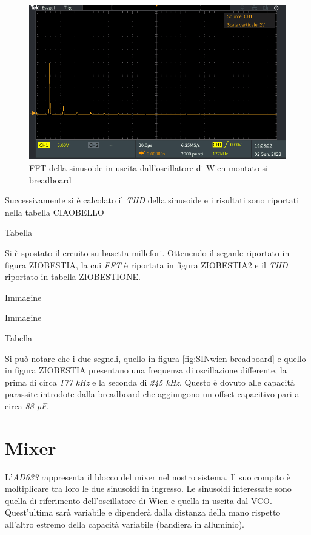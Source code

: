 \documentclass[titlepage]{report}
\begin{document}
	\begin{figure}[H]
		\centering
		\includegraphics[scale=0.5]{Immagini/FFT wien giusto bread.PNG}
		\caption{FFT della sinusoide in uscita dall'oscillatore di Wien montato si breadboard}
		\label{fig:FFT SINwien breadboard}
	\end{figure} 

	Successivamente si è calcolato il \textit{THD} della sinusoide e i risultati sono riportati nella tabella CIAOBELLO

	Tabella

	Si è spostato il crcuito su basetta millefori. Ottenendo il seganle riportato in figura ZIOBESTIA, la cui \textit{FFT} è riportata in figura ZIOBESTIA2 e il \textit{THD} riportato in tabella ZIOBESTIONE.

	Immagine

	Immagine

	Tabella

	Si può notare che i due segneli, quello in figura \ref{fig:SINwien breadboard} e quello in figura ZIOBESTIA presentano una frequenza di oscillazione differente, la prima di circa \textit{177 kHz} e la seconda di \textit{245 kHz}. Questo è dovuto alle capacità parassite introdote dalla breadboard che aggiungono un offset capacitivo pari a circa \textit{88 pF}.




\section{Mixer}
\label{sec:Mixer}

	L'\textit{AD633} rappresenta il blocco del mixer nel nostro sistema. Il suo compito è moltiplicare tra loro le due sinusoidi in ingresso. Le sinusoidi interessate sono quella di riferimento dell'oscillatore di Wien e quella in uscita dal VCO. Quest'ultima sarà variabile e dipenderà dalla distanza della mano rispetto all'altro estremo della capacità variabile (bandiera in alluminio).
\end{document}
